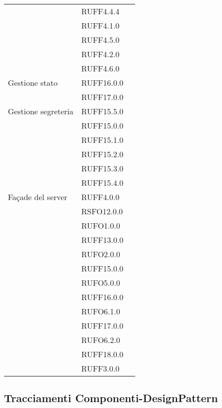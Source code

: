 \begin{center}
\begin{longtable}{lp{}l}
 & RUFF4.4.4 \\
 & RUFF4.1.0 \\
 & RUFF4.5.0 \\
 & RUFF4.2.0 \\
 & RUFF4.6.0 \\
Gestione stato & RUFF16.0.0 \\
 & RUFF17.0.0 \\
Gestione segreteria & RUFF15.5.0 \\
 & RUFF15.0.0 \\
 & RUFF15.1.0 \\
 & RUFF15.2.0 \\
 & RUFF15.3.0 \\
 & RUFF15.4.0 \\
Façade del server & RUFF4.0.0 \\
 & RSFO12.0.0 \\
 & RUFO1.0.0 \\
 & RUFF13.0.0 \\
 & RUFO2.0.0 \\
 & RUFF15.0.0 \\
 & RUFO5.0.0 \\
 & RUFF16.0.0 \\
 & RUFO6.1.0 \\
 & RUFF17.0.0 \\
 & RUFO6.2.0 \\
 & RUFF18.0.0 \\
 & RUFF3.0.0 \\
\bottomrule
\end{longtable}
\end{center}
\subsection{Tracciamenti Componenti-DesignPattern}\label{sec:tracCompDp}

